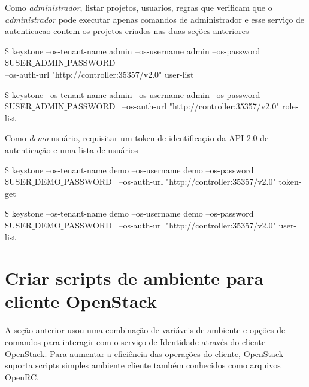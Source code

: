 		\item Como \emph{administrador}, listar projetos, usuarios, regras que verificam que o \emph{administrador} pode executar apenas comandos de administrador e esse serviço de autenticacao contem os projetos criados nas duas seções anteriores
		
		\begin{snugshade}
			\$ keystone --os-tenant-name admin --os-username admin --os-password\\ \$USER$\_$ADMIN$\_$PASSWORD \ \\
		--os-auth-url "http://controller:35357/v2.0" user-list
		\end{snugshade}
		
		
		\begin{snugshade}
			\$ keystone --os-tenant-name admin --os-username admin --os-password\\ \$USER$\_$ADMIN$\_$PASSWORD \
		--os-auth-url "http://controller:35357/v2.0" role-list
		\end{snugshade}
		
		
		\item Como \emph{demo} usuário, requisitar um token de identificação da API 2.0 de autenticação e uma lista de usuários
		\begin{snugshade}
			\$ keystone --os-tenant-name demo --os-username demo --os-password \\ \$USER$\_$DEMO$\_$PASSWORD \
		--os-auth-url "http://controller:35357/v2.0" token-get
		\end{snugshade}		
		
		\begin{snugshade}
			\$ keystone --os-tenant-name demo --os-username demo --os-password \\ \$USER$\_$DEMO$\_$PASSWORD \
		--os-auth-url "http://controller:35357/v2.0" user-list
		\end{snugshade}		
		
		\section{Criar scripts de ambiente para cliente OpenStack }
		A seção anterior usou uma combinação de variáveis de ambiente e opções de comandos para interagir com o serviço de Identidade através do cliente OpenStack. Para aumentar a eficiência das operações do cliente, OpenStack suporta scripts simples ambiente cliente também conhecidos como arquivos OpenRC.
		
